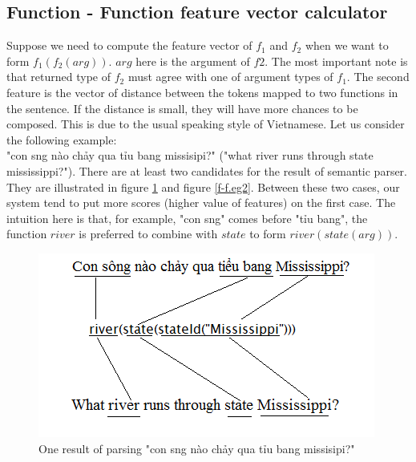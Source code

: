 \subsection{Function - Function feature vector calculator}
\label{sec:model.function-function}
Suppose we need to compute the feature vector of $f_1$ and $f_2$ when we want to form $f_1(f_2(arg))$. $arg$ here is the argument of $f2$. The most important note is that returned type of $f_2$ must agree with one of argument types of $f_1$. The second feature is the vector of distance between the tokens mapped to two functions in the sentence. If the distance is small, they will have more chances to be composed. This is due to the usual speaking style of Vietnamese. Let us consider the following example: \\
 "{\selectfont con s\ocircumflex ng n\`ao ch\h{a}y qua ti\h\ecircumflex u bang missisipi?" ("what river runs through state mississippi?")}. There are at least two candidates for the result of semantic parser. They are illustrated in figure \ref{f-f.eg1} and figure \ref{f-f.eg2}. Between these two cases, our system tend to put more scores (higher value of features) on the first case. The intuition here is that, for example, "{\selectfont con s\ocircumflex ng}" comes before "{\selectfont ti\h\ecircumflex u bang}", the function $river$ is preferred to combine with $state$ to form $river(state(arg))$.
\begin{figure}[h]
\centering
\includegraphics[scale=0.7]{eg-function-function-mapping1.png}
\caption{One result of parsing "{\selectfont con s\ocircumflex ng n\`ao ch\h{a}y qua ti\h\ecircumflex u bang missisipi?}"}
\label{f-f.eg1}
\end{figure}

